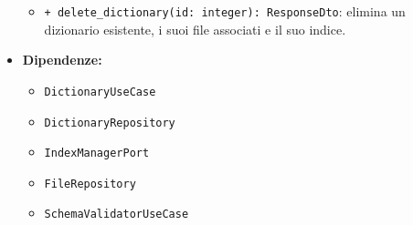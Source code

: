 \begin{itemize}
\begin{itemize}
        \item \texttt{+ delete\_dictionary(id: integer): ResponseDto}: elimina un dizionario esistente, i suoi file associati e il suo indice.
    \end{itemize}
    \item \textbf{Dipendenze:}
    \begin{itemize}
        \item \texttt{DictionaryUseCase}
        \item \texttt{DictionaryRepository}
        \item \texttt{IndexManagerPort}
        \item \texttt{FileRepository}
        \item \texttt{SchemaValidatorUseCase}
    \end{itemize}
\end{itemize}

